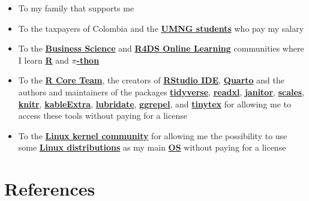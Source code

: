 \documentclass[
  ignorenonframetext,
]{beamer}
\begin{document}
\begin{frame}{}
\label{section-18}
\begin{itemize}
\item
  To my family that supports me
\item
  To the taxpayers of Colombia and the
  \href{https://www.umng.edu.co/estudiante}{\textbf{UMNG students}} who
  pay my salary
\item
  To the \href{https://www.business-science.io/}{\textbf{Business
  Science}} and \href{https://www.rfordatasci.com/}{\textbf{R4DS Online
  Learning}} communities where I learn
  \href{https://www.r-project.org/about.html}{\textbf{R}} and
  \href{https://www.python.org/about/}{\textbf{\(\pi\)-thon}}
\item
  To the \href{https://www.r-project.org/contributors.html}{\textbf{R
  Core Team}}, the creators of
  \href{https://rstudio.com/products/rstudio/}{\textbf{RStudio IDE}},
  \href{https://quarto.org/}{\textbf{Quarto}} and the authors and
  maintainers of the packages
  \href{https://CRAN.R-project.org/package=tidyverse}{\textbf{tidyverse}},
  \href{https://CRAN.R-project.org/package=readxl}{\textbf{readxl}},
  \href{https://CRAN.R-project.org/package=janitor}{\textbf{janitor}},
  \href{https://CRAN.R-project.org/package=scales}{\textbf{scales}},
  \href{https://CRAN.R-project.org/package=knitr}{\textbf{knitr}},
  \href{https://CRAN.R-project.org/package=kableExtra}{\textbf{kableExtra}},
  \href{https://CRAN.R-project.org/package=lubridate}{\textbf{lubridate}},
  \href{https://CRAN.R-project.org/package=ggrepel}{\textbf{ggrepel}},
  and
  \href{https://CRAN.R-project.org/package=tinytex}{\textbf{tinytex}}
  for allowing me to access these tools without paying for a license
\item
  To the \href{https://www.kernel.org/category/about.html}{\textbf{Linux
  kernel community}} for allowing me the possibility to use some
  \href{https://static.lwn.net/Distributions/}{\textbf{Linux
  distributions}} as my main
  \href{https://en.wikipedia.org/wiki/Operating_system}{\textbf{OS}}
  without paying for a license
\end{itemize}
\end{frame}

\section*{References}\label{references}
\end{document}
